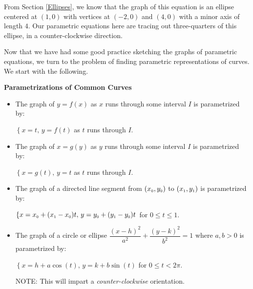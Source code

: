 \documentclass{ximera}
\begin{document}
\begin{example}
\begin{explanation}
\begin{enumerate}
   From Section \ref{Ellipses}, we know that the graph of this equation is an ellipse centered at $(1,0)$ with vertices at $(-2,0)$ and $(4,0)$ with a minor axis of length $4$.  Our parametric equations here are tracing out three-quarters of this ellipse, in a  counter-clockwise direction.


\begin{center}
\end{center}

\end{enumerate}
\end{explanation}
\end{example}

Now that we have had some good practice sketching the graphs of parametric equations, we turn to the problem of finding parametric representations of curves.  We start with the following.




\label{commonparametrizations}


\centerline{\textbf{Parametrizations of Common Curves}}

\begin{itemize}

\item  The graph of  $y=f(x)$ as $x$ runs through some interval $I$ is parametrized by:

$\left\{ x = t, \, y = f(t) \right.$ as  $t$ runs through $I$.

\item  The graph of  $x=g(y)$ as $y$ runs through some interval $I$ is parametrized by:

$\left\{ x = g(t), \, y = t \right.$ as  $t$ runs through $I$.

\item  The graph of a  directed line segment from $(x_{\text{\tiny$0$}}, y_{\text{\tiny$0$}})$ to $(x_{\text{\tiny$1$}}, y_{\text{\tiny$1$}})$ is parametrized by:

$\left\{ x  = x_{\text{\tiny$0$}} + (x_{\text{\tiny$1$}} - x_{\text{\tiny$0$}}) t, \, y = y_{\text{\tiny$0$}} + (y_{\text{\tiny$1$}} - y_{\text{\tiny$0$}}) t \right.$  for $0 \leq t \leq 1$.



\item  The graph of a circle or ellipse $\dfrac{(x-h)^2}{a^2} + \dfrac{(y-k)^2}{b^2} = 1$ where $a,b > 0$ is parametrized by:

$\left\{ x =  h+a\cos(t), \, y = k+b\sin(t) \right.$  for $0 \leq t < 2\pi$. 

NOTE:  This will impart a \textit{counter-clockwise} orientation.

\end{itemize}
\end{document}
